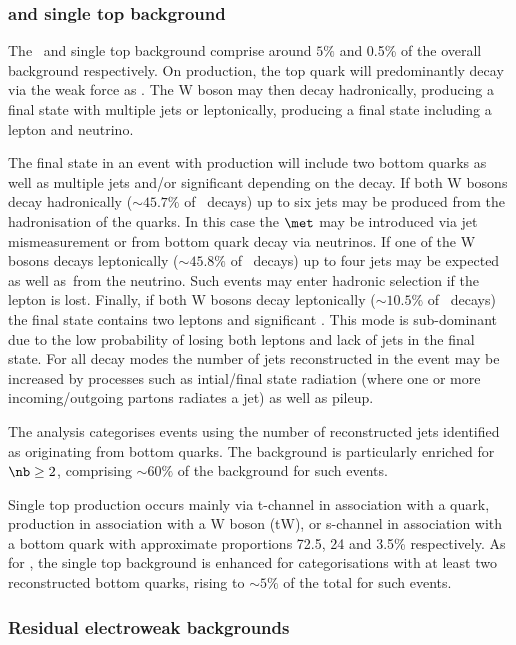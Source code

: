 \subsubsection{\ttj and single top background}
\label{sec:topbg}
The \ttj~and single top background comprise around $5\%$ and 0.5\% of the overall
background respectively. On production, the top quark will predominantly decay via the 
weak force as \twb. The W boson may then decay hadronically, producing a final state
with multiple jets or leptonically, producing a final state including a lepton and neutrino. 

The final state in an event with \ttj production will include two bottom quarks as well as multiple 
jets and/or significant \met depending on the decay. If both W bosons decay hadronically ($\sim45.7\%$ of \ttbar~decays)
up to six jets may be produced from the hadronisation of the quarks. In this case the $\met$
may be introduced via jet mismeasurement or from bottom quark decay via neutrinos. If one of the 
W bosons decays leptonically ($\sim45.8\%$ of \ttbar~decays) up to four jets may be expected
as well as~\met from the neutrino. Such events may enter hadronic selection if the lepton is lost.
Finally, if both W bosons decay leptonically ($\sim10.5\%$ of \ttbar~decays) the final state contains two 
leptons and significant \met. This mode is sub-dominant due to the low probability of losing both leptons
and lack of jets in the final state. For all decay modes the number of jets reconstructed in the event
may be increased by processes such as intial/final state radiation (where one or more incoming/outgoing partons
radiates a jet) as well as pileup.

The \alphat analysis categorises events using the number of reconstructed 
jets identified as originating from bottom quarks. The \ttbar background is particularly
enriched for $\nb \ge 2$, comprising $\sim60\%$ of the background for such events.

Single top production occurs mainly via t-channel in association with a quark, production in 
association with a W boson (tW), or s-channel in association with a bottom quark with approximate
proportions 72.5, 24 and 3.5\% respectively. As for \ttj, the single top background is enhanced for 
categorisations with at least two reconstructed bottom quarks, rising to $\sim5\%$ of the total for
such events.

\subsubsection{Residual electroweak backgrounds}

